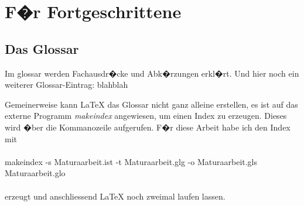 \documentclass[a4paper,11pt]{report}
\begin{document}
\chapter{F�r Fortgeschrittene}
\section{Das Glossar}
Im \gls{glossar} werden Fachausdr�cke und Abk�rzungen erkl�rt. Und hier noch ein weiterer Glossar-Eintrag: \gls{blahblah}

Gemeinerweise kann \LaTeX{} das Glossar nicht ganz alleine erstellen, es ist auf das externe Programm \emph{makeindex} angewiesen, um einen Index zu erzeugen. Dieses wird �ber die Kommanozeile aufgerufen. F�r diese Arbeit habe ich den Index mit
\\ \\
makeindex -s Maturaarbeit.ist -t Maturaarbeit.glg -o Maturaarbeit.gls Maturaarbeit.glo
\\ \\
erzeugt und anschliessend \LaTeX{} noch zweimal laufen lassen.

\printglossary[nonumberlist,title=Glossar]
\end{document}
